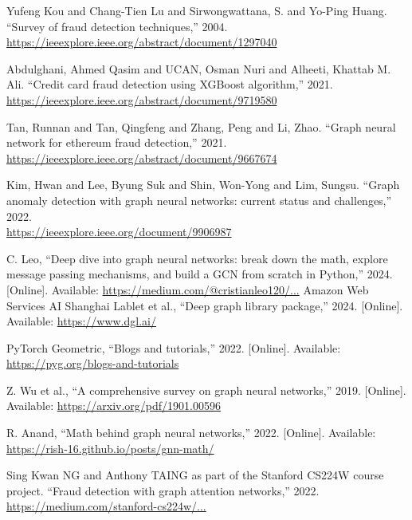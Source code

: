 \documentclass[conference]{IEEEtran}
\begin{document}
\begin{thebibliography}{99}
Yufeng Kou and Chang-Tien Lu and Sirwongwattana, S. and Yo-Ping Huang. ``Survey of fraud detection techniques,'' 2004.\\
\href{https://ieeexplore.ieee.org/abstract/document/1297040}{https://ieeexplore.ieee.org/abstract/document/1297040}


Abdulghani, Ahmed Qasim and UCAN, Osman Nuri and Alheeti, Khattab M. Ali. ``Credit card fraud detection using XGBoost algorithm,'' 2021.\\
\href{https://ieeexplore.ieee.org/abstract/document/9719580}{https://ieeexplore.ieee.org/abstract/document/9719580}

Tan, Runnan and Tan, Qingfeng and Zhang, Peng and Li, Zhao. ``Graph neural network for ethereum fraud detection,'' 2021.\\
\href{https://ieeexplore.ieee.org/abstract/document/9667674}{https://ieeexplore.ieee.org/abstract/document/9667674}

Kim, Hwan and Lee, Byung Suk and Shin, Won-Yong and Lim, Sungsu. ``Graph anomaly detection with graph neural networks: current status and challenges,'' 2022.\\
\href{https://ieeexplore.ieee.org/document/9906987}{https://ieeexplore.ieee.org/document/9906987}


C. Leo, ``Deep dive into graph neural networks: break down the math, explore message passing mechanisms, and build a GCN from scratch in Python,'' 2024. [Online]. Available: \href{https://medium.com/@cristianleo120/the-math-behind-graph-neural-networks-3427c16570d0}{https://medium.com/@cristianleo120/...}
Amazon Web Services AI Shanghai Lablet et al., ``Deep graph library package,'' 2024. [Online]. Available: \href{https://www.dgl.ai/}{https://www.dgl.ai/}

PyTorch Geometric, ``Blogs and tutorials,'' 2022. [Online]. Available: \href{https://pyg.org/blogs-and-tutorials}{https://pyg.org/blogs-and-tutorials}

Z. Wu et al., ``A comprehensive survey on graph neural networks,'' 2019. [Online]. Available: \href{https://arxiv.org/pdf/1901.00596}{https://arxiv.org/pdf/1901.00596}

R. Anand, ``Math behind graph neural networks,'' 2022. [Online]. Available: \href{https://rish-16.github.io/posts/gnn-math/}{https://rish-16.github.io/posts/gnn-math/}


Sing Kwan NG and Anthony TAING as part of the Stanford CS224W course project. ``Fraud detection with graph attention networks,'' 2022.\\
\href{https://medium.com/stanford-cs224w/fraud-detection-with-gat-edac49bda1a0}{https://medium.com/stanford-cs224w/...}


\end{thebibliography}
\end{document}
